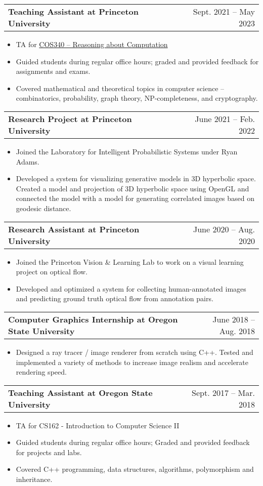 \documentclass[a4paper,12pt]{article}
\makeatletter
\newenvironment{joblong}[2]
    {
    \begin{tabularx}{\linewidth}{@{}l X r@{}}
    \textbf{#1} & \hfill &  #2 \\[3.75pt]
    \end{tabularx}
    \begin{minipage}[t]{\linewidth}
    \begin{itemize}[nosep,after=\strut, leftmargin=1em, itemsep=3pt,label=--]
    }
    {
    \end{itemize}
    \end{minipage}    
    }
\makeatother
\begin{document}
\begin{joblong}{Teaching Assistant at Princeton University}{Sept. 2021 – May 2023}
\item TA for \href{https://www.cs.princeton.edu/courses/archive/fall21/cos340/}{COS340 – Reasoning about Computation}
\item Guided students during regular office hours; graded and provided feedback for assignments and exams.
\item Covered mathematical and theoretical topics in computer science – combinatorics, probability, graph theory, NP-completeness, and cryptography.
\end{joblong}

\begin{joblong}{Research Project at Princeton University}{June 2021 – Feb. 2022}
\item Joined the Laboratory for Intelligent Probabilistic Systems under Ryan Adams.
\item Developed a system for visualizing generative models in 3D hyperbolic space. Created a model and projection of 3D hyperbolic space using OpenGL and connected the model with a model for generating correlated images based on geodesic distance.
\end{joblong}

\begin{joblong}{Research Assistant at Princeton University}{June 2020 – Aug. 2020}
\item Joined the Princeton Vision \& Learning Lab to work on a visual learning project on optical flow.
\item Developed and optimized a system for collecting human-annotated images and predicting ground truth optical flow from annotation pairs.
\end{joblong}

\begin{joblong}{Computer Graphics Internship at Oregon State University}{June 2018 – Aug. 2018}
\item Designed a ray tracer / image renderer from scratch using C++. Tested and implemented a variety of methods to increase image realism and accelerate rendering speed.
\end{joblong}

\begin{joblong}{Teaching Assistant at Oregon State University}{Sept. 2017 – Mar. 2018}
\item TA for CS162 - Introduction to Computer Science II
\item Guided students during regular office hours; Graded and provided feedback for projects and labs.
\item Covered C++ programming, data structures, algorithms, polymorphism and inheritance.
\end{joblong}
\end{document}
